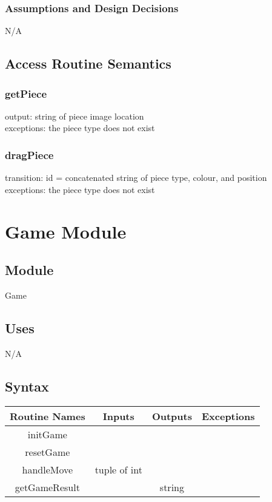 \documentclass[12pt, titlepage]{article}
\begin{document}
        \subsubsection*{Assumptions and Design Decisions}
            N/A
            
    \subsection*{Access Routine Semantics}
    
        \subsubsection*{getPiece}
            output: string of piece image location \\ 
            exceptions: the piece type does not exist
            
        \subsubsection*{dragPiece}
            transition: id = concatenated string of piece type, colour, and position \\
            exceptions: the piece type does not exist
            

\newpage
\section*{Game Module}
    \subsection*{Module}
        Game
    
    \subsection*{Uses}
        N/A
    
    \subsection*{Syntax}
        \begin{center}
            \begin{tabular}{|c|c|c|c|} 
                \hline
                Routine Names & Inputs & Outputs & Exceptions \\
                \hline
                initGame &  &  & \\ 
                \hline
                resetGame &  &  & \\ 
                \hline
                handleMove & tuple of int &  & \\ 
                \hline
                getGameResult & & string &  \\ 
                \hline
            \end{tabular}
        \end{center}
    
\end{document}

